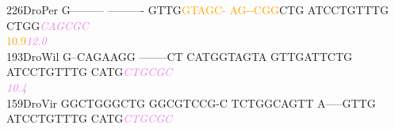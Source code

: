 \documentclass[11pt,twoside,reqno,a4paper]{article}
\begin{document}
{226\hspace*{1\charwidth}DroPer	G---------	----------	GTTG\textcolor{orange}{G}\textcolor{orange}{T}\textcolor{orange}{A}\textcolor{orange}{G}\textcolor{orange}{C}\textcolor{orange}{-}	\textcolor{orange}{A}\textcolor{orange}{G}\textcolor{orange}{-}\textcolor{orange}{-}\textcolor{orange}{C}\textcolor{orange}{G}\textcolor{orange}{G}CTG	ATCCTGTTTG	CTGG\textit{\textcolor{violet}{C}}\textit{\textcolor{violet}{A}}\textit{\textcolor{violet}{G}}\textit{\textcolor{violet}{C}}\textit{\textcolor{violet}{G}}\textit{\textcolor{violet}{C}}	\\
\hspace*{4\charwidth}\hspace*{7\charwidth}\hspace*{1\charwidth}\hspace*{1\charwidth}\hspace*{24\charwidth}\textcolor{orange}{10.9}\hspace*{1\charwidth}\hspace*{1\charwidth}\hspace*{1\charwidth}\hspace*{26\charwidth}\textit{\textcolor{violet}{12.0}}\hspace*{1\charwidth}\\
193\hspace*{1\charwidth}DroWil	G--CAGAAGG	--------CT	CATGGTAGTA	GTTGATTCTG	ATCCTGTTTG	CATG\textit{\textcolor{violet}{C}}\textit{\textcolor{violet}{T}}\textit{\textcolor{violet}{G}}\textit{\textcolor{violet}{C}}\textit{\textcolor{violet}{G}}\textit{\textcolor{violet}{C}}	\\
\hspace*{4\charwidth}\hspace*{7\charwidth}\hspace*{1\charwidth}\hspace*{1\charwidth}\hspace*{1\charwidth}\hspace*{1\charwidth}\hspace*{1\charwidth}\hspace*{54\charwidth}\textit{\textcolor{violet}{10.4}}\hspace*{1\charwidth}\\
159\hspace*{1\charwidth}DroVir	GGCTGGGCTG	GGCGTCCG-C	TCTGGCAGTT	A-----GTTG	ATCCTGTTTG	CATG\textit{\textcolor{violet}{C}}\textit{\textcolor{violet}{T}}\textit{\textcolor{violet}{G}}\textit{\textcolor{violet}{C}}\textit{\textcolor{violet}{G}}\textit{\textcolor{violet}{C}}	\\
}
\end{document}
